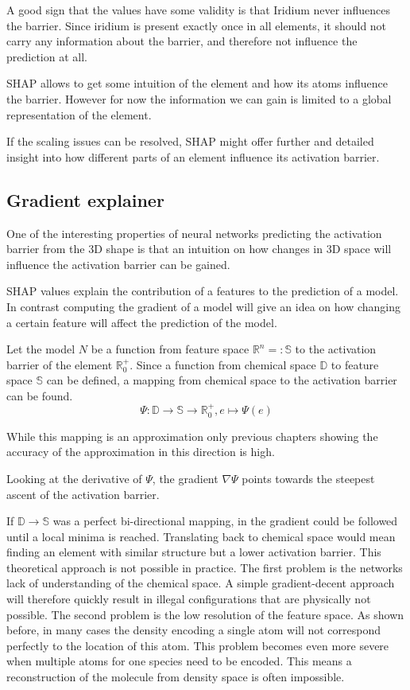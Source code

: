 A good sign that the values have some validity is that Iridium never influences the barrier.
Since iridium is present exactly once in all elements, it should not carry any information about the barrier,
and therefore not influence the prediction at all.

SHAP allows to get some intuition of the element and how its atoms influence the barrier.
However for now the information we can gain is limited to a global representation of the element.

If the scaling issues can be resolved, SHAP might offer further and detailed insight into how different parts of an element influence its activation barrier.

\subsection{Gradient explainer}

One of the interesting properties of neural networks predicting the activation barrier from the 3D shape is 
that an intuition on how changes in 3D space will influence the activation barrier can be gained.

SHAP values explain the contribution of a features to the prediction of a model.
In contrast computing the gradient of a model will give an idea on how changing a certain feature will affect the prediction of the model.

Let the model $N$ be a function from feature space $\mathbb{R}^n =: \mathbb{S}$ to the activation barrier of the element $\mathbb{R}^+_0$.
Since a function from chemical space $\mathbb{D}$ to feature space $\mathbb{S}$ can be defined,
a mapping from chemical space to the activation barrier can be found.
$$ \Psi : \mathbb{D} \to \mathbb{S} \to \mathbb{R}^+_0, e \mapsto \Psi(e) $$

While this mapping is an approximation only previous chapters showing 
the accuracy of the approximation in this direction is high.

Looking at the derivative of $\Psi$, the gradient $\nabla \Psi$ points towards the steepest ascent of the activation barrier.

If $\mathbb{D} \to \mathbb{S}$ was a perfect bi-directional mapping, in the gradient could be followed until a local minima is reached.
Translating back to chemical space would mean finding an element with similar structure but a lower activation barrier.
This theoretical approach is not possible in practice.
The first problem is the networks lack of understanding of the chemical space.
A simple gradient-decent approach will therefore quickly result in illegal configurations 
that are physically not possible.
The second problem is the low resolution of the feature space.
As shown before, in many cases the density encoding a single atom will not correspond perfectly to the location of this atom.
This problem becomes even more severe when multiple atoms for one species need to be encoded.
This means a reconstruction of the molecule from density space is often impossible.

